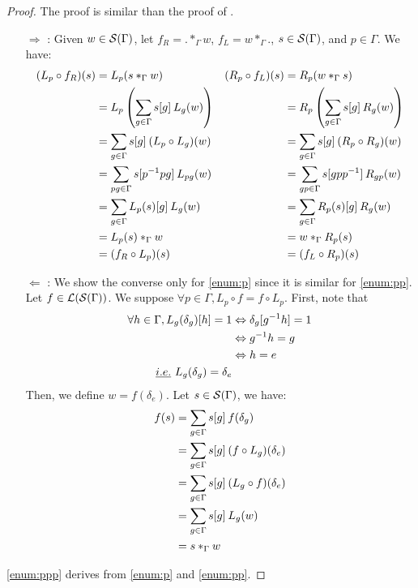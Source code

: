 \begin{proof}
The proof is similar than the proof of .
\begin{itemize}
  \item[$\Rightarrow$]: Given $w \in \cs(\Gamma)$, let $f_R = .\ast_\Gamma w$, $f_L = w \ast_\Gamma .$, $s \in \cs(\Gamma)$, and $p \in \Gamma$. We have:
  \begin{align*}
  (L_p \circ f_R) (s) & = L_p( s \ast_\Gamma w )                                         & (R_p \circ f_L) (s) & = R_p( w \ast_\Gamma s )\\
                & = L_p\left(\displaystyle \sum_{g \in \Gamma} s[g] \h{2} L_g(w)\right)       & & = R_p\left(\displaystyle \sum_{g \in \Gamma} s[g] \h{2} R_g(w)\right)\\
                & = \displaystyle \sum_{g \in \Gamma} s[g] \h{2} (L_p \circ L_g)(w)           & & = \displaystyle \sum_{g \in \Gamma} s[g] \h{2} (R_p \circ R_g)(w)\\
                & = \displaystyle \sum_{pg \in \Gamma} s[p^{-1}pg] \h{2} L_{pg}(w)            & & = \displaystyle \sum_{gp \in \Gamma} s[gpp^{-1}] \h{2} R_{gp}(w)\\          
                & = \displaystyle \sum_{g \in \Gamma} L_p(s)[g] \h{2} L_g(w)                  & & = \displaystyle \sum_{g \in \Gamma} R_p(s)[g] \h{2} R_g(w)\\
                & = L_p(s) \ast_\Gamma w                                                      & & = w \ast_\Gamma R_p(s)\\
                & = (f_R \circ L_p) (s)                                                         & & = (f_L \circ R_p) (s)
  \end{align*}
  \item[$\Leftarrow$]: We show the converse only for \ref{enum:p} since it is similar for  \ref{enum:pp}.
  Let $f \in \cl(\cs(\Gamma))$. We suppose $\forall p \in \Gamma, L_p \circ f = f \circ L_p$. First, note that
  \begin{align*}
  \forall h \in \Gamma, L_g(\delta_g)[h] = 1 & \Leftrightarrow \delta_g[g^{-1}h] = 1\\
  & \Leftrightarrow g^{-1}h = g\\
  & \Leftrightarrow h = e\\
  \ie L_g(\delta_g) = \delta_e
  \end{align*}
  Then, we define $w = f(\delta_e)$. Let $s \in \cs(\Gamma)$, we have:
  \begin{align*}
  f(s) & = \sum_{g \in \Gamma} s[g] \h{2} f(\delta_g)\\
       & = \sum_{g \in \Gamma} s[g] \h{2} (f \circ L_g) (\delta_e)\\
       & = \sum_{g \in \Gamma} s[g] \h{2} (L_g \circ f) (\delta_e)\\
       & = \sum_{g \in \Gamma} s[g] \h{2} L_g(w)\\
       & = s \ast_\Gamma w
  \end{align*}
\end{itemize}
\ref{enum:ppp} derives from \ref{enum:p} and \ref{enum:pp}.
\end{proof}

